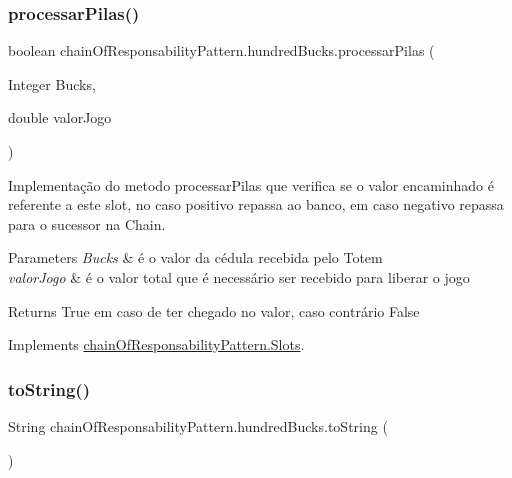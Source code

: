 \subsubsection{\texorpdfstring{processarPilas()}{processarPilas()}}
{\footnotesize\ttfamily boolean chain\+Of\+Responsability\+Pattern.\+hundred\+Bucks.\+processar\+Pilas (\begin{DoxyParamCaption}\item[{Integer}]{Bucks,  }\item[{double}]{valor\+Jogo }\end{DoxyParamCaption})}



Implementação do metodo processar\+Pilas que verifica se o valor encaminhado é referente a este slot, no caso positivo repassa ao banco, em caso negativo repassa para o sucessor na Chain. 


\begin{DoxyParams}{Parameters}
{\em Bucks} & é o valor da cédula recebida pelo Totem \\
\hline
{\em valor\+Jogo} & é o valor total que é necessário ser recebido para liberar o jogo \\
\hline
\end{DoxyParams}
\begin{DoxyReturn}{Returns}
True em caso de ter chegado no valor, caso contrário False 
\end{DoxyReturn}


Implements \mbox{\hyperlink{interfacechain_of_responsability_pattern_1_1_slots_ade54039583c4faf4126847fe7c143862}{chain\+Of\+Responsability\+Pattern.\+Slots}}.

\mbox{\label{classchain_of_responsability_pattern_1_1hundred_bucks_a58cfa32d43b172c490f25603060e4dde}} 
\subsubsection{\texorpdfstring{toString()}{toString()}}
{\footnotesize\ttfamily String chain\+Of\+Responsability\+Pattern.\+hundred\+Bucks.\+to\+String (\begin{DoxyParamCaption}{ }\end{DoxyParamCaption})}



